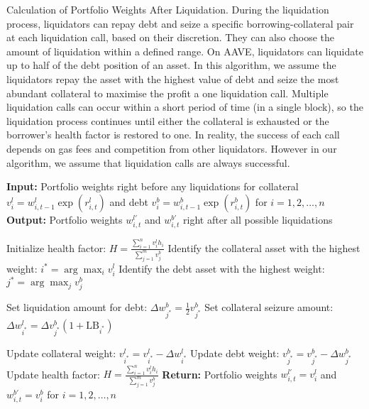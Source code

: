 \documentclass{article} %
\theoremstyle{plain}
\theoremstyle{definition} %
\begin{document}
\begin{algorithm}
  \caption{Calculation of Portfolio Weights After Liquidation. 
  During the liquidation process, 
  liquidators can repay debt and seize a specific borrowing-collateral pair at each liquidation call, based on their discretion. 
  They can also choose the amount of liquidation within a defined range. 
  On AAVE, liquidators can liquidate up to half of the debt position of an asset.
  In this algorithm, we assume the liquidators repay the asset with the highest value of debt and seize the most abundant collateral to maximise the profit a one liquidation call.
  Multiple liquidation calls can occur within a short period of time (in a single block), so 
  the liquidation process continues until either the collateral is exhausted or the borrower's health factor is restored to one.
  In reality, the success of each call depends on gas fees and competition from other liquidators. 
  However in our algorithm, we assume that liquidation calls are always successful. }
  \label{alg:liquidation_weights}
  \begin{algorithmic}[1]
  \STATE \textbf{Input:} Portfolio weights right before any liquidations for collateral $v^l_i=w^l_{i,t-1}\exp(r^l_{i, t})$ and debt $v^b_i=w^b_{i,t-1}\exp(r^b_{i, t})$ for $i=1,2,\dots,n$
  \STATE \textbf{Output:} Portfolio weights $w^{l'}_{i,t}$ and $w^{b'}_{i,t}$ right after all possible liquidations
  
  \STATE Initialize health factor: $H = \frac{\sum_{i=1}^{n} v^l_ih_i}{\sum_{j=1}^{m} v^b_j}$
      \STATE Identify the collateral asset with the highest weight: $i^* = \arg\max_i v^l_i$
      \STATE Identify the debt asset with the highest weight: $j^* = \arg\max_j v^b_j$

      \STATE Set liquidation amount for debt: $\Delta w^b_{j^*} = \frac{1}{2} v^b_{j^*}$
      \STATE Set collateral seizure amount: $\Delta w^l_{i^*} = \Delta v^b_{j^*} (1 + \text{LB}_{i^*})$
      
      \STATE Update collateral weight: $v^{l}_{i^*} = v^l_{i^*} - \Delta w^l_{i^*}$
      \STATE Update debt weight: $v^{b}_{j^*} = v^b_{j^*} - \Delta w^b_{j^*}$
      \STATE Update health factor: $H = \frac{\sum_{i=1}^{n} v^{l}_i h_i}{\sum_{j=1}^{m} v^{b}_j}$
  \ENDWHILE
  \STATE \textbf{Return:} Portfolio weights $w^{l'}_{i,t}=v^{l}_i$ and $w^{b'}_{i,t}=v^{b}_i$ for $i=1,2,\dots,n$
  \end{algorithmic}
  \end{algorithm}
\end{document}
